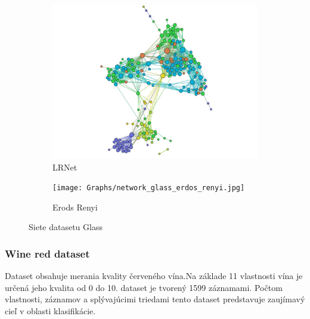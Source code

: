 \documentclass[slovak,master,dept460,male,cpp,cpdeclaration]{diploma}
\begin{document}
\begin{figure}[H]
\begin{subfigure}{0.45\textwidth}
    \includegraphics[width=\linewidth, frame]{Graphs/network_glass_lrnet.jpg}
    \caption{LRNet}
    \label{fig:wine_lrnet}
\end{subfigure}\hfil
\begin{subfigure}{0.45\textwidth}
    \centering
    \texttt{[image: Graphs/network\_glass\_erdos\_renyi.jpg]}
    \caption{Erods Renyi}
    \label{fig:wine_erdos_renyi}
\end{subfigure}
\caption{Siete datasetu Glass}
\label{fig:wine_networks}
\end{figure}

\subsubsection{Wine red dataset}
Dataset obsahuje merania kvality červeného vína.Na základe 11 vlastnosti vína je určená jeho kvalita od 0 do 10. dataset je tvorený 1599 záznamami. Počtom vlastnosti, záznamov a splývajúcimi triedami tento dataset predstavuje zaujímavý cieľ v oblasti klasifikácie. \cite{wine}
\end{document}
